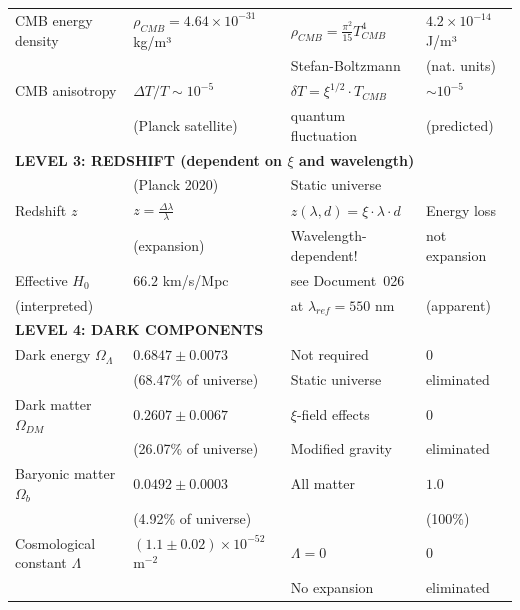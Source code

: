 \begin{longtable}{p{4.0cm}p{3.2cm}p{2.8cm}p{2.8cm}}
	CMB energy density & $\rho_{CMB} = 4.64 \times 10^{-31}$ kg/m³ & $\rho_{CMB} = \frac{\pi^2}{15} T_{CMB}^4$ & $4.2 \times 10^{-14}$ J/m³ \\
	& & Stefan-Boltzmann & (nat. units) \\[0.3em]
	
	CMB anisotropy & $\Delta T/T \sim 10^{-5}$ & $\delta T = \xi^{1/2} \cdot T_{CMB}$ & $\sim 10^{-5}$ \\
	& (Planck satellite) & quantum fluctuation & (predicted) \\[0.3em]
	
	\midrule
	\multicolumn{4}{l}{\textbf{LEVEL 3: REDSHIFT (dependent on $\xi$ and wavelength)}} \\
	\midrule
	
	& (Planck 2020) & Static universe & \\[0.3em]
	
	Redshift $z$ & $z = \frac{\Delta\lambda}{\lambda}$ & $z(\lambda, d) = \xi \cdot \lambda \cdot d$ & Energy loss \\
	& (expansion) & Wavelength-dependent! & not expansion \\[0.3em]
	
	Effective $H_0$ & $66.2$ km/s/Mpc & see Document~026 \\
	(interpreted) & & at $\lambda_{ref} = 550$ nm & (apparent) \\[0.3em]
	
	\midrule
	\multicolumn{4}{l}{\textbf{LEVEL 4: DARK COMPONENTS}} \\
	\midrule
	
	Dark energy $\Omega_\Lambda$ & $0.6847 \pm 0.0073$ & Not required & $0$ \\
	& (68.47\% of universe) & Static universe & eliminated \\[0.3em]
	
	Dark matter $\Omega_{DM}$ & $0.2607 \pm 0.0067$ & $\xi$-field effects & $0$ \\
	& (26.07\% of universe) & Modified gravity & eliminated \\[0.3em]
	
	Baryonic matter $\Omega_b$ & $0.0492 \pm 0.0003$ & All matter & $1.0$ \\
	& (4.92\% of universe) & & (100\%) \\[0.3em]
	
	Cosmological constant $\Lambda$ & $(1.1 \pm 0.02) \times 10^{-52}$ m$^{-2}$ & $\Lambda = 0$ & $0$ \\
	& & No expansion & eliminated \\[0.3em]
	

\end{longtable}
